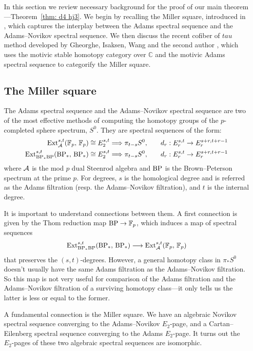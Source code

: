 In this section we review necessary background for the proof of our main theorem---Theorem~\ref{thm: d4 hj3}. We begin by recalling the Miller square, introduced in \cite{MillerSquare}, which captures the interplay between the Adams spectral sequence and the Adams--Novikov spectral sequence. We then discuss the recent cofiber of $tau$ method developed by Gheorghe, Isaksen, Wang and the second author \cite{GWX, IWX, IWX2}, which uses the motivic stable homotopy category over $\mathbb{C}$ and the motivic Adams spectral sequence to categorify the Miller square. %

\subsection{The Miller square}\hfill

The Adams spectral sequence and the Adams--Novikov spectral sequence are two of the most effective methods of computing the homotopy groups of the $p$-completed sphere spectrum, $S^0$. They are spectral sequences of the form:
\begin{align*}
  \operatorname{\mathrm{Ext}}_{\operatorname{\mathcal{A}}}^{s,t}(\operatorname{\mathbb{F}}_p,\, \operatorname{\mathbb{F}}_p) &\cong E_2^{s,t} \Longrightarrow \pi_{t-s}S^0, \ &&  d_r:E_r^{s,t} \rightarrow E_r^{s+r, t+r-1} \\
  \operatorname{\mathrm{Ext}}_{\mathrm{BP}_*\mathrm{BP}}^{s,t}(\mathrm{BP}_*,\, \mathrm{BP}_*) &\cong E_2^{s,t} \Longrightarrow \pi_{t-s}S^0, \quad &&  d_r:E_r^{s,t} \rightarrow E_r^{s+r, t+r-1}
\end{align*}
where $\operatorname{\mathcal{A}}$ is the mod $p$ dual Steenrod algebra and $\mathrm{BP}$ is the Brown--Peterson spectrum at the prime $p$. For degrees, $s$ is the homological degree and is referred as the Adams filtration (resp. the Adams--Novikov filtration), and $t$ is the internal degree.


It is important to understand connections between them. A first connection is given by the Thom reduction map $\mathrm{BP}\rightarrow \operatorname{\mathbb{F}}_p$, which induces a map of spectral sequences
$$\operatorname{\mathrm{Ext}}_{\mathrm{BP}_*\mathrm{BP}}^{s,t}(\mathrm{BP}_*,\, \mathrm{BP}_*) \longrightarrow \operatorname{\mathrm{Ext}}_{\operatorname{\mathcal{A}}}^{s,t}(\operatorname{\mathbb{F}}_p,\, \operatorname{\mathbb{F}}_p)$$
that preserves the $(s,t)$-degrees.
However, a general homotopy class in $\pi_{*}S^0$ doesn't usually have the same Adams filtration as the Adams--Novikov filtration. So this map is not very useful for comparison of the Adams filtration and the Adams--Novikov filtration of a surviving homotopy class---it only tells us the latter is less or equal to the former.

A fundamental connection is the Miller square. We have an algebraic Novikov spectral sequence converging to the Adams--Novikov $E_2$-page, and a Cartan--Eilenberg spectral sequence converging to the Adams $E_2$-page. It turns out the $E_2$-pages of these two algebraic spectral sequences are isomorphic.

